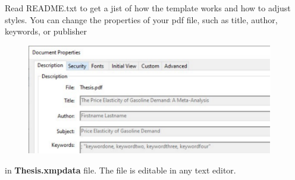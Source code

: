 Read README.txt to get a jist of how the template works and how to adjust styles.
You can change the properties of your pdf file, such as title, author, keywords, or publisher

\begin{figure}[H]
	\centering
		\includegraphics[width=0.96\textwidth]{Figures/properties.pdf}
	\label{fig:properties}
\end{figure}

\noindent in \textbf{Thesis.xmpdata} file. The file is editable in any text editor.



